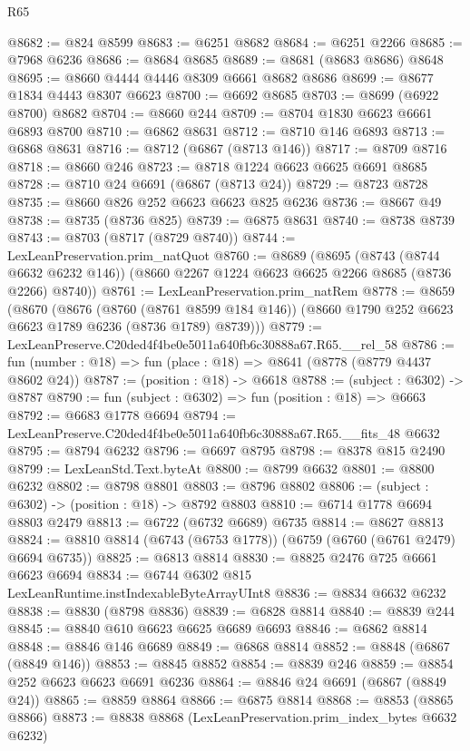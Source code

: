 \begin{lexlean}{R65}
\begin{coremodule}
{@8682 := @824 @8599
@8683 := @6251 @8682
@8684 := @6251 @2266
@8685 := @7968 @6236
@8686 := @8684 @8685
@8689 := @8681 (@8683 @8686) @8648
@8695 := @8660 @4444 @4446 @8309 @6661 @8682 @8686
@8699 := @8677 @1834 @4443 @8307 @6623
@8700 := @6692 @8685
@8703 := @8699 (@6922 @8700) @8682
@8704 := @8660 @244
@8709 := @8704 @1830 @6623 @6661 @6893 @8700
@8710 := @6862 @8631
@8712 := @8710 @146 @6893
@8713 := @6868 @8631
@8716 := @8712 (@6867 (@8713 @146))
@8717 := @8709 @8716
@8718 := @8660 @246
@8723 := @8718 @1224 @6623 @6625 @6691 @8685
@8728 := @8710 @24 @6691 (@6867 (@8713 @24))
@8729 := @8723 @8728
@8735 := @8660 @826 @252 @6623 @6623 @825 @6236
@8736 := @8667 @49
@8738 := @8735 (@8736 @825)
@8739 := @6875 @8631
@8740 := @8738 @8739
@8743 := @8703 (@8717 (@8729 @8740))
@8744 := LexLeanPreservation.prim_natQuot
@8760 := @8689
    (@8695
      (@8743 (@8744 @6632 @6232 @146))
      (@8660 @2267 @1224 @6623 @6625 @2266 @8685 (@8736 @2266) @8740))
@8761 := LexLeanPreservation.prim_natRem
@8778 := @8659
    (@8670
      (@8676
        (@8760 (@8761 @8599 @184 @146))
        (@8660 @1790 @252 @6623 @6623 @1789 @6236 (@8736 @1789) @8739)))
@8779 := LexLeanPreserve.C20ded4f4be0e5011a640fb6c30888a67.R65.__rel_58
@8786 := fun (number : @18) => fun (place : @18) => @8641 (@8778 (@8779 @4437 @8602 @24))
@8787 := (position : @18) -> @6618
@8788 := (subject : @6302) -> @8787
@8790 := fun (subject : @6302) => fun (position : @18) => @6663
@8792 := @6683 @1778 @6694
@8794 := LexLeanPreserve.C20ded4f4be0e5011a640fb6c30888a67.R65.__fits_48 @6632
@8795 := @8794 @6232
@8796 := @6697 @8795
@8798 := @8378 @815 @2490
@8799 := LexLeanStd.Text.byteAt
@8800 := @8799 @6632
@8801 := @8800 @6232
@8802 := @8798 @8801
@8803 := @8796 @8802
@8806 := (subject : @6302) -> (position : @18) -> @8792 @8803
@8810 := @6714 @1778 @6694 @8803 @2479
@8813 := @6722 (@6732 @6689) @6735
@8814 := @8627 @8813
@8824 := @8810 @8814 (@6743 (@6753 @1778)) (@6759 (@6760 (@6761 @2479) @6694 @6735))
@8825 := @6813 @8814
@8830 := @8825 @2476 @725 @6661 @6623 @6694
@8834 := @6744 @6302 @815 LexLeanRuntime.instIndexableByteArrayUInt8
@8836 := @8834 @6632 @6232
@8838 := @8830 (@8798 @8836)
@8839 := @6828 @8814
@8840 := @8839 @244
@8845 := @8840 @610 @6623 @6625 @6689 @6693
@8846 := @6862 @8814
@8848 := @8846 @146 @6689
@8849 := @6868 @8814
@8852 := @8848 (@6867 (@8849 @146))
@8853 := @8845 @8852
@8854 := @8839 @246
@8859 := @8854 @252 @6623 @6623 @6691 @6236
@8864 := @8846 @24 @6691 (@6867 (@8849 @24))
@8865 := @8859 @8864
@8866 := @6875 @8814
@8868 := @8853 (@8865 @8866)
@8873 := @8838 @8868 (LexLeanPreservation.prim_index_bytes @6632 @6232)
}
\end{coremodule}
\end{lexlean}
